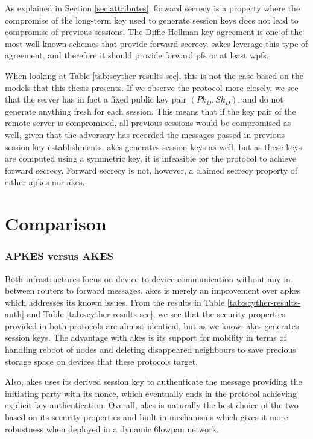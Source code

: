 As explained in Section \ref{sec:attributes}, forward secrecy is a property where the compromise of the long-term key used to generate session keys does not lead to compromise of previous sessions. The Diffie-Hellman key agreement is one of the most well-known schemes that provide forward secrecy. \gls{sakes} leverage this type of agreement, and therefore it should provide forward \gls{pfs} or at least \gls{wpfs}.

When looking at Table \ref{tab:scyther-results-sec}, this is not the case based on the models that this thesis presents. If we observe the protocol more closely, we see that the server has in fact a fixed public key pair $(Pk_D, Sk_D)$, and do not generate anything fresh for each session. This means that if the key pair of the remote server is compromised, all previous sessions would be compromised as well, given that the adversary has recorded the messages passed in previous session key establishments. \gls{akes} generates session keys as well, but as these keys are computed using a symmetric key, it is infeasible for the protocol to achieve forward secrecy. Forward secrecy is not, however, a claimed secrecy property of either \gls{apkes} nor {akes}.


\section{Comparison}

\subsubsection{APKES versus AKES}

Both infrastructures focus on device-to-device communication without any in-between routers to forward messages. \gls{akes} is merely an improvement over \gls{apkes} which addresses its known issues. From the results in Table \ref{tab:scyther-results-auth} and Table \ref{tab:scyther-results-sec}, we see that the security properties provided in both protocols are almost identical, but as we know: \gls{akes} generates session keys. The advantage with \gls{akes} is its support for mobility in terms of handling reboot of nodes and deleting disappeared neighbours to save precious storage space on devices that these protocols target.

Also, \gls{akes} uses its derived session key to authenticate the message providing the initiating party with its nonce, which eventually ends in the protocol achieving explicit key authentication. Overall, \gls{akes} is naturally the best choice of the two based on its security properties and built in mechanisms which gives it more robustness when deployed in a dynamic \gls{6lowpan} network.

